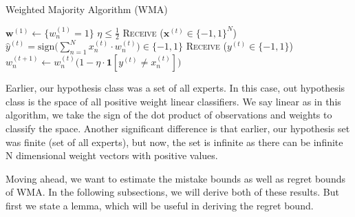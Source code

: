 \documentclass[11pt]{article}
\begin{document}
\begin{algorithm}[H]
\caption{Weighted Majority Algorithm (WMA)}
\label{algo:wma}
\begin{algorithmic}[1]
\STATE $\textbf{w}^{(1)} \leftarrow \{w_n^{(1)}=1\}$ \hfill 
\STATE $\eta\leq\frac{1}{2}$\hfill 
{}
\STATE \textsc{Receive} ($\textbf{x}^{(t)}\in\{-1, 1\}^N$) \hfill
\STATE $\hat{y}^{(t)} = \text{sign}\Big(\sum_{n=1}^Nx_n^{(t)}\cdot w_n^{(t)}\Big)\in\{-1, 1\}$ \hfill
\STATE \textsc{Receive} ($y^{(t)}\in\{-1, 1\}$) \hfill 
\STATE $w_n^{(t+1)}\leftarrow w_n^{(t)}\big(1-\eta\cdot\textbf{1}[y^{(t)}\neq x_n^{(t)}]\big)$ \hfill 
\ENDFOR
\end{algorithmic}
\end{algorithm}

Earlier, our hypothesis class was a set of all experts. In this case, out hypothesis class is the space of all positive weight linear classifiers. We say linear as in this algorithm, we take the sign of the dot product of observations and weights to classify the space. Another significant difference is that earlier, our hypothesis set was finite (set of all experts), but now, the set is infinite as there can be infinite N dimensional weight vectors with positive values. 

Moving ahead, we want to estimate the mistake bounds as well as regret bounds of WMA. In the following subsections, we will derive both of these results. But first we state a lemma, which will be useful in deriving the regret bound.
\end{document}
